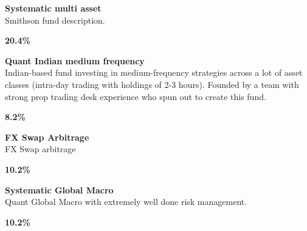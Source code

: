 \documentclass[11pt]{article}
\begin{document}
\begin{tcolorbox}[colback=cardbg, colframe=cardborder, boxrule=0.5pt, arc=4pt, left=6pt, right=6pt, top=6pt, bottom=6pt]
    \begin{minipage}[c]{0.82\linewidth}
        \textbf{\textcolor{primary}{Systematic multi asset}} \\[4pt]
        \textcolor{primary}{Smithson fund description.}
    \end{minipage}%
    \hfill
    \begin{minipage}[c]{0.15\linewidth}
        \centering
        \textbf{\Large \textcolor{accent}{20.4\%}}
    \end{minipage}
\end{tcolorbox}

\begin{tcolorbox}[colback=cardbg, colframe=cardborder, boxrule=0.5pt, arc=4pt, left=6pt, right=6pt, top=6pt, bottom=6pt]
    \begin{minipage}[c]{0.82\linewidth}
        \textbf{\textcolor{primary}{Quant Indian medium frequency}} \\[4pt]
        \textcolor{primary}{Indian-based fund investing in medium-frequency strategies across a lot of asset classes (intra-day trading with holdings of 2-3 hours). Founded by a team with strong prop trading desk experience who spun out to create this fund.}
    \end{minipage}%
    \hfill
    \begin{minipage}[c]{0.15\linewidth}
        \centering
        \textbf{\Large \textcolor{accent}{8.2\%}}
    \end{minipage}
\end{tcolorbox}

\begin{tcolorbox}[colback=cardbg, colframe=cardborder, boxrule=0.5pt, arc=4pt, left=6pt, right=6pt, top=6pt, bottom=6pt]
    \begin{minipage}[c]{0.82\linewidth}
        \textbf{\textcolor{primary}{FX Swap Arbitrage}} \\[4pt]
        \textcolor{primary}{FX Swap arbitrage}
    \end{minipage}%
    \hfill
    \begin{minipage}[c]{0.15\linewidth}
        \centering
        \textbf{\Large \textcolor{accent}{10.2\%}}
    \end{minipage}
\end{tcolorbox}

\begin{tcolorbox}[colback=cardbg, colframe=cardborder, boxrule=0.5pt, arc=4pt, left=6pt, right=6pt, top=6pt, bottom=6pt]
    \begin{minipage}[c]{0.82\linewidth}
        \textbf{\textcolor{primary}{Systematic Global Macro}} \\[4pt]
        \textcolor{primary}{Quant Global Macro with extremely well done risk management.}
    \end{minipage}%
    \hfill
    \begin{minipage}[c]{0.15\linewidth}
        \centering
        \textbf{\Large \textcolor{accent}{10.2\%}}
    \end{minipage}
\end{tcolorbox}
\end{document}
